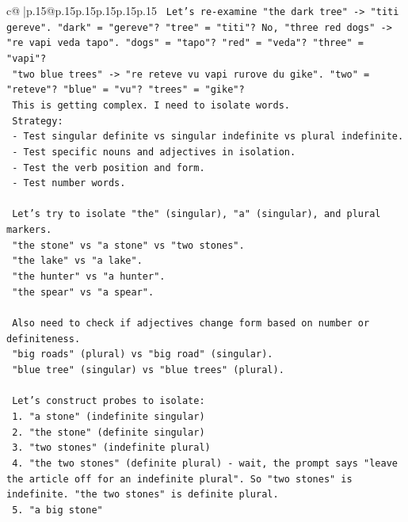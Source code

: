 \documentclass{article}
\begin{document}
{\begin{supertabular}{c@{$\;$}|p{.15\linewidth}@{}p{.15\linewidth}p{.15\linewidth}p{.15\linewidth}p{.15\linewidth}p{.15\linewidth}}
{{{\texttt{    Let's re{-}examine "the dark tree" {-}> "titi gereve". "dark" = "gereve"? "tree" = "titi"? No, "three red dogs" {-}> "re vapi veda tapo". "dogs" = "tapo"? "red" = "veda"? "three" = "vapi"?} \\
\texttt{    "two blue trees" {-}> "re reteve vu vapi rurove du gike". "two" = "reteve"? "blue" = "vu"? "trees" = "gike"?} \\
\texttt{    This is getting complex. I need to isolate words.} \\
\texttt{    Strategy:} \\
\texttt{    {-} Test singular definite vs singular indefinite vs plural indefinite.} \\
\texttt{    {-} Test specific nouns and adjectives in isolation.} \\
\texttt{    {-} Test the verb position and form.} \\
\texttt{    {-} Test number words.} \\
\\ 
\texttt{    Let's try to isolate "the" (singular), "a" (singular), and plural markers.} \\
\texttt{    "the stone" vs "a stone" vs "two stones".} \\
\texttt{    "the lake" vs "a lake".} \\
\texttt{    "the hunter" vs "a hunter".} \\
\texttt{    "the spear" vs "a spear".} \\
\\ 
\texttt{    Also need to check if adjectives change form based on number or definiteness.} \\
\texttt{    "big roads" (plural) vs "big road" (singular).} \\
\texttt{    "blue tree" (singular) vs "blue trees" (plural).} \\
\\ 
\texttt{    Let's construct probes to isolate:} \\
\texttt{    1.  "a stone" (indefinite singular)} \\
\texttt{    2.  "the stone" (definite singular)} \\
\texttt{    3.  "two stones" (indefinite plural)} \\
\texttt{    4.  "the two stones" (definite plural) {-} wait, the prompt says "leave the article off for an indefinite plural". So "two stones" is indefinite. "the two stones" is definite plural.} \\
\texttt{    5.  "a big stone"} \\
}}}
\end{supertabular}}
\end{document}
